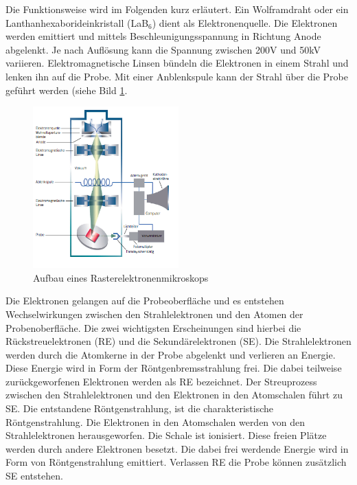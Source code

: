 \documentclass[a4paper, 11pt]{tubsreprt}
\begin{document}
Die Funktionsweise wird im Folgenden kurz erläutert. Ein Wolframdraht oder ein Lanthanhexaborideinkristall (LaB$_{6}$) dient als Elektronenquelle. Die Elektronen werden emittiert und mittels Beschleunigungsspannung in Richtung Anode abgelenkt. Je nach Auflösung kann die Spannung zwischen 200V und 50kV variieren. Elektromagnetische Linsen bündeln die Elektronen in einem Strahl und lenken ihn auf die Probe. Mit einer Anblenkspule kann der Strahl über die Probe geführt werden (siehe Bild \ref{REM Aufbau}.  


\begin{figure} %
\centering
\includegraphics[width=0.5\textwidth]{Bilder/REM.png}
\caption[Aufbau eines Rasterelektronenmikroskops]{Aufbau eines Rasterelektronenmikroskops \cite{Welsch2015}}
\label{REM Aufbau}
\end{figure}

Die Elektronen gelangen auf die Probeoberfläche und es entstehen Wechselwirkungen zwischen den Strahlelektronen und den Atomen der Probenoberfläche. Die zwei wichtigsten Erscheinungen sind hierbei die Rückstreuelektronen (RE) und die Sekundärelektronen (SE). Die Strahlelektronen werden durch die Atomkerne in der Probe abgelenkt und verlieren an Energie. Diese Energie wird in Form der Röntgenbremsstrahlung frei. Die dabei teilweise zurückgeworfenen Elektronen werden als RE bezeichnet. Der Streuprozess zwischen den Strahlelektronen und den Elektronen in den Atomschalen führt zu SE. Die entstandene Röntgenstrahlung, ist die charakteristische Röntgenstrahlung. Die Elektronen in den Atomschalen werden von den Strahlelektronen herausgeworfen. Die Schale ist ionisiert. Diese freien Plätze werden durch andere Elektronen besetzt. Die dabei frei werdende Energie wird in Form von Röntgenstrahlung emittiert. Verlassen RE die Probe können zusätzlich SE entstehen.
\end{document}
